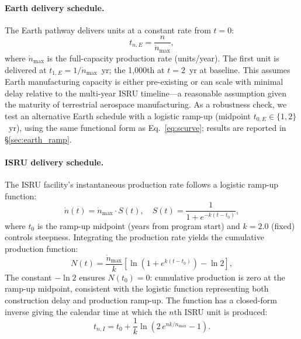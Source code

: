 \documentclass[preprint,12pt]{elsarticle}
\begin{document}
\paragraph{Earth delivery schedule.} The Earth pathway delivers units at a constant rate from $t = 0$:
\begin{equation}
  t_{n,E} = \frac{n}{\dot{n}_{\max}},
  \label{eq:earth_schedule}
\end{equation}
where $\dot{n}_{\max}$ is the full-capacity production rate (units/year). The first unit is delivered at $t_{1,E} = 1/\dot{n}_{\max}$~yr; the 1{,}000th at $t = 2$~yr at baseline. This assumes Earth manufacturing capacity is either pre-existing or can scale with minimal delay relative to the multi-year ISRU timeline---a reasonable assumption given the maturity of terrestrial aerospace manufacturing. As a robustness check, we test an alternative Earth schedule with a logistic ramp-up (midpoint $t_{0,E} \in \{1, 2\}$~yr), using the same functional form as Eq.~\ref{eq:scurve}; results are reported in \S\ref{sec:earth_ramp}.

\paragraph{ISRU delivery schedule.} The ISRU facility's instantaneous production rate follows a logistic ramp-up function:
\begin{equation}
  \dot{n}(t) = \dot{n}_{\max} \cdot S(t), \quad S(t) = \frac{1}{1 + e^{-k(t - t_0)}},
  \label{eq:scurve}
\end{equation}
where $t_0$ is the ramp-up midpoint (years from program start) and $k = 2.0$ (fixed) controls steepness. Integrating the production rate yields the cumulative production function:
\begin{equation}
  N(t) = \frac{\dot{n}_{\max}}{k} \left[ \ln\!\left(1 + e^{k(t - t_0)}\right) - \ln 2 \right],
  \label{eq:cumulative_production}
\end{equation}
The constant $-\ln 2$ ensures $N(t_0) = 0$: cumulative production is zero at the ramp-up midpoint, consistent with the logistic function representing both construction delay and production ramp-up. The function has a closed-form inverse giving the calendar time at which the $n$th ISRU unit is produced:
\begin{equation}
  t_{n,I} = t_0 + \frac{1}{k} \ln\!\left(2\,e^{nk/\dot{n}_{\max}} - 1\right).
  \label{eq:production_schedule}
\end{equation}
\end{document}
